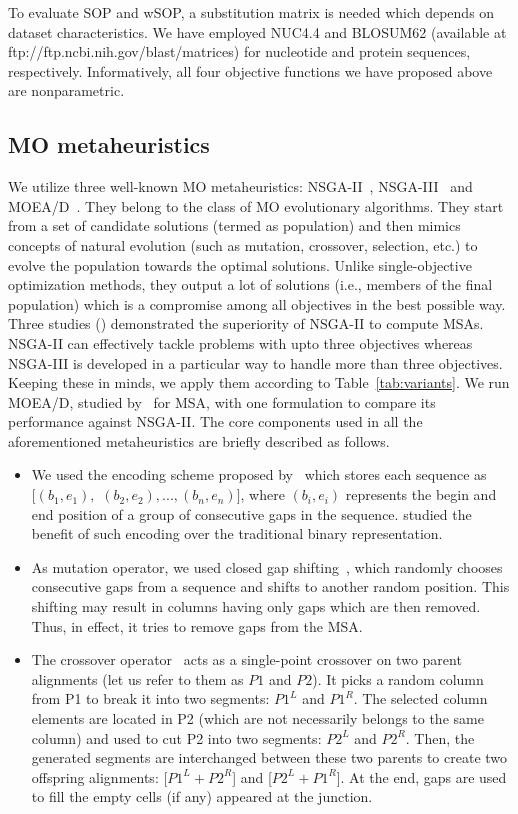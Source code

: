 To evaluate SOP and wSOP, a substitution matrix is needed which depends on dataset characteristics. We have employed NUC4.4 and BLOSUM62 (available at ftp://ftp.ncbi.nih.gov/blast/matrices) for nucleotide and protein sequences, respectively. Informatively, all four objective functions we have proposed above are nonparametric.\subsection{MO metaheuristics}
We utilize three well-known MO metaheuristics: NSGA-II~\citep{deb2002fast}, NSGA-III~\citep{deb2014evolutionary} and MOEA/D~\citep{zhang2007moea}. They belong to the class of MO evolutionary algorithms. They start from a set of candidate solutions (termed as population) and then mimics concepts of natural evolution (such as mutation, crossover, selection, etc.) to evolve the population towards the optimal solutions. Unlike single-objective optimization methods, they output a lot of solutions (i.e., members of the final population) which is a compromise among all objectives in the best possible way. Three studies (\citep{zambrano2017m2align, ortuno2013optimizing, zambrano2017comparing}) demonstrated the superiority of NSGA-II to compute MSAs. NSGA-II can effectively tackle problems with upto three objectives whereas NSGA-III is developed in a particular way to handle more than three objectives. Keeping these in minds, we apply them according to Table~\ref{tab:variants}. We run MOEA/D, studied by~\cite{zhu2015novel} for MSA, with one formulation to compare its performance against NSGA-II. The core components used in all the aforementioned metaheuristics are briefly described as follows. 
\begin{itemize}
	\item We used the encoding scheme proposed by~\cite{rubio2016hybrid} which stores each sequence as $[(b_1, e_1),$ $(b_2, e_2), ..., (b_n, e_n)]$, where $(b_i, e_i)$ represents the begin and end position of a group of consecutive gaps in the sequence. \cite{zambrano2017m2align} studied the benefit of such encoding over the traditional binary representation.
	
	\item As mutation operator, we used closed gap shifting~\cite{ortuno2013optimizing}, which randomly chooses consecutive gaps from a sequence and shifts to another random position. This shifting may result in columns having only gaps which are then removed. Thus, in effect, it tries to remove gaps from the MSA. 
	
	\item The crossover operator~\citealp{da2010alineaga} acts as a single-point crossover on two parent alignments (let us refer to them as $ P1 $ and $ P2 $). It picks a random column from P1 to break it into two segments: $ P1^L $ and $ P1^R $. The selected column elements are located in P2 (which are not necessarily belongs to the same column) and used to cut P2 into two segments: $ P2^L $ and $ P2^R $. Then, the generated segments are interchanged between these two parents to create two offspring alignments: [$P1^L + P2^R$] and [$P2^L + P1^R$]. At the end, gaps are used to fill the empty cells (if any) appeared at the junction.
\end{itemize}

